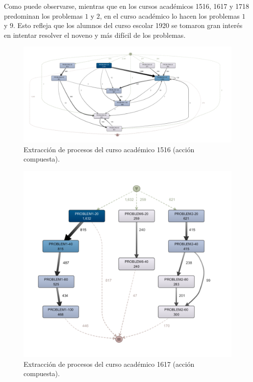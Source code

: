 Como puede observarse, mientras que en los cursos académicos 1516, 1617 y 1718 predominan los problemas $1$ y $2$, en el curso académico lo hacen los problemas $1$ y $9$. Esto refleja que los alumnos del curso escolar 1920 se tomaron gran interés en intentar resolver el noveno y más difícil de los problemas.

\begin{figure}[H]
    \centering
    \includegraphics[width=1.25\textwidth]{imagenes/DISCO_compound/Year1516.png}
    \caption{Extracción de procesos del curso académico 1516 (acción compuesta).}
    \label{fig:año1516}
\end{figure}

\begin{figure}[H]
    \centering
    \includegraphics[width=1.25\textwidth]{imagenes/DISCO_compound/Year1617.png}
    \caption{Extracción de procesos del curso académico 1617 (acción compuesta).}
    \label{fig:año1617}
\end{figure}

